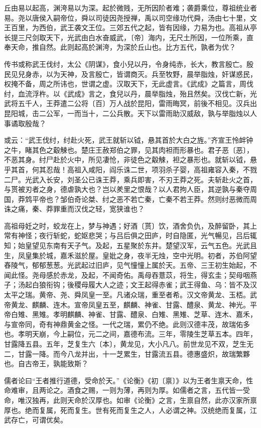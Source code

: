 \documentclass[]{article}
\begin{document}
丘由易以起高，渊洿易以为深。起於微贱，无所因阶者难；袭爵乘位，尊祖统业者易。尧以唐侯入嗣帝位，舜以司徒因尧授禅，禹以司空缘功代舜，汤由七十里，文王百里，为西伯，武王袭文王位。三郊五代之起，皆有因缘，力易为也。高祖从亭长提三尺剑取天下，光武由白水奋威武，〔帝〕海内，无尺土所因，一位所乘，直奉天命，推自然。此则起高於渊洿，为深於丘山也。比方五代，孰者为优？

传书或称武王伐纣，太公《阴谋》，食小兒以丹，令身纯赤，长大，教言殷亡。殷民见兒身赤，以为天神，及言殷亡，皆谓商灭。兵至牧野，晨举脂烛，奸谋惑民，权掩不备，周之所讳也，世谓之虚。汉取天下，无此虚言。《武成》之篇言，周伐纣，血流浮杵。以《武成》言之，食兒以丹，晨举脂烛，殆且然矣。汉伐亡新，光武将五千人，王莽遣二公将〔百〕万人战於昆阳，雷雨晦冥，前後不相见。汉兵出昆阳城，击二公军，一而当十，二公兵散。天下以雷雨助汉威敌，孰与举脂烛以人事谲取殷哉？

或云：``武王伐纣，纣赴火死，武王就斩以钺，悬其首於大白之旌。''齐宣王怜衅钟之牛，睹其色之觳觫也。楚庄王赦郑伯之罪，见其肉袒而形暴也。君子恶〔恶〕，不恶其身。纣尸赴於火中，所见凄怆，非徒色之觳觫，袒之暴形也。就斩以钺，悬乎其首，何其忍哉！高祖入咸阳，阎乐诛二世，项羽杀子婴，高祖雍容入秦，不戮二尸。光武入长安，刘圣公已诛王莽，乘兵即害，不刃王莽之死。夫斩赴火之首，与贳被刃者之身，德虐孰大也？岂以羑里之恨哉？以人君拘人臣，其逆孰与秦夺周国，莽鸩平帝也？邹伯奇论桀、纣之恶不若亡秦，亡秦不若王莽。然则纣恶微而周诛之痛，秦、莽罪重而汉伐之轻，宽狭谁也？

高祖母妊之时，蛟龙在上，梦与神遇；好酒〔贳〕饮，酒舍负仇，及醉留卧，其上常有神怪；夜行斩蛇，蛇妪悲哭；与吕后俱之田庐，时自隐匿，光气暢见，吕后辄知；始皇望见东南有天子气。及起，五星聚於东井。楚望汉军，云气五色。光武且生，凤皇集於城，嘉禾滋於屋。皇妣之身，夜半无烛，空中光明。初者，苏伯阿望舂陵气，郁郁葱葱。光武起过旧庐，见气憧憧上属於天。五帝、三王初生始起，不闻此怪。尧母感於赤龙，及起，不闻奇佑。禹母吞薏苡，将生，得玄圭；契母咽燕子；汤起白狼衔钩；後稷母履大人之迹；文王起得赤雀；武王得鱼、乌：皆不及汉太平之瑞。黄帝、尧、舜凤皇一至。凡诸众瑞，重至者希。汉文帝黄龙、玉桮。武帝黄龙、麒麟、连木。宣帝凤皇五至，麒麟、神雀、甘露、醴泉、黄龙、神光。平帝白雉、黑雉。孝明麒麟、神雀、甘露、醴泉、白雉、黑雉、芝草、连木、嘉禾，与宣帝同，奇有神鼎黄金之怪。一代之瑞，累仍不绝。此则汉德丰茂，故瑞佑多也。孝明天崩，今上嗣位，元二之间，嘉德布流。三年，零陵生芝草五本。四年，甘露降五县。五年，芝复生六〔本〕，黄龙见，大小凡八。前世龙见不双，芝生无二，甘露一降。而今八龙并出，十一芝累生，甘露流五县。德惠盛炽，故瑞繁夥也。自古帝王，孰能致斯？

儒者论曰``王者推行道德，受命於天。''《论衡》《初〔禀〕》以为王者生禀天命，性命难审，且两论之。酒食之赐，一则为薄，再则为厚。如儒者之言，五代皆一受命，唯汉独再，此则天命於汉厚也。如审《论衡》之言，生禀自然，此亦汉家所禀厚也。绝而复属，死而复生。世有死而复生之人，人必谓之神。汉统绝而复属，江武存亡，可谓优矣。
\end{document}
